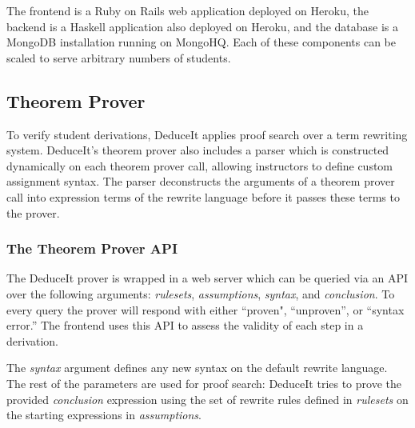 \documentclass{sigchi}
\begin{document}
The frontend is a Ruby on Rails web application deployed on Heroku, the backend is a Haskell application also deployed on Heroku, and the database is a MongoDB installation running on MongoHQ. Each of these components can be scaled to serve arbitrary numbers of students.

\subsection{Theorem Prover}

To verify student derivations, DeduceIt applies proof search over a term rewriting system. 
DeduceIt's theorem prover also includes a parser which is constructed dynamically on each theorem prover call, allowing instructors to define custom assignment syntax. The parser deconstructs the arguments of a theorem prover call into expression terms of the rewrite language before it passes these terms to the prover.

\subsubsection{The Theorem Prover API}

The DeduceIt prover is wrapped in a web server which can be queried via an API over the following arguments: \textit{rulesets}, \textit{assumptions}, \textit{syntax}, and \textit{conclusion}. To every query the prover will respond with either ``proven", ``unproven'', or ``syntax error.'' The frontend uses this API to assess the validity of each step in a derivation.

The \textit{syntax} argument defines any new syntax on the default rewrite language. The rest of the parameters are used for proof search: DeduceIt tries to prove the provided \textit{conclusion} expression using the set of rewrite rules defined in \textit{rulesets} on the starting expressions in \textit{assumptions}. 

\end{document}
